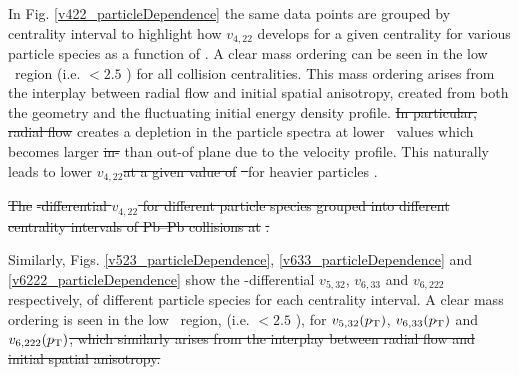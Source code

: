 \documentclass[ALICE,manyauthors]{cernphprep}
\providecommand{\DIFaddtex}[1]{{\protect\color{blue}\uwave{#1}}} %
\providecommand{\DIFdeltex}[1]{{\protect\color{red}\sout{#1}}}                      %
\providecommand{\DIFaddbegin}{} %
\providecommand{\DIFaddend}{} %
\providecommand{\DIFdelbegin}{} %
\providecommand{\DIFdelend}{} %
\providecommand{\DIFdelFL}[1]{\DIFdel{#1}} %
\providecommand{\DIFadd}[1]{\texorpdfstring{\DIFaddtex{#1}}{#1}} %
\providecommand{\DIFdel}[1]{\texorpdfstring{\DIFdeltex{#1}}{}} %
\newcommand{\DIFscaledelfig}{0.5}
\newlength{\DIFdelgraphicswidth} %
\newlength{\DIFdelgraphicsheight} %
\newcommand{\DIFaddincludegraphics}[2][]{{\color{blue}\fbox{\DIFOincludegraphics[#1]{#2}}}} %
\newcommand{\DIFdelincludegraphics}[2][]{%
\sbox{\DIFdelgraphicsbox}{\DIFOincludegraphics[#1]{#2}}%
\settoboxwidth{\DIFdelgraphicswidth}{\DIFdelgraphicsbox} %
\settoboxtotalheight{\DIFdelgraphicsheight}{\DIFdelgraphicsbox} %
\scalebox{\DIFscaledelfig}{%
\parbox[b]{\DIFdelgraphicswidth}{\usebox{\DIFdelgraphicsbox}\\[-\baselineskip] \rule{\DIFdelgraphicswidth}{0em}}\llap{\resizebox{\DIFdelgraphicswidth}{\DIFdelgraphicsheight}{%
\setlength{\unitlength}{\DIFdelgraphicswidth}%
\begin{picture}(1,1)%
\thicklines\linethickness{2pt} %
{\color[rgb]{1,0,0}\put(0,0){\framebox(1,1){}}}%
{\color[rgb]{1,0,0}\put(0,0){\line( 1,1){1}}}%
{\color[rgb]{1,0,0}\put(0,1){\line(1,-1){1}}}%
\end{picture}%
}\hspace*{3pt}}} %
} %
\DeclareRobustCommand{\DIFaddbegin}{\DIFOaddbegin \let\includegraphics\DIFaddincludegraphics} %
\DeclareRobustCommand{\DIFaddend}{\DIFOaddend \let\includegraphics\DIFOincludegraphics} %
\DeclareRobustCommand{\DIFdelbegin}{\DIFOdelbegin \let\includegraphics\DIFdelincludegraphics} %
\DeclareRobustCommand{\DIFdelend}{\DIFOaddend \let\includegraphics\DIFOincludegraphics} %
\begin{document}
\newpage

In Fig. \ref{v422_particleDependence} the same data points are grouped by centrality interval to highlight how $v_{4,22}$ develops for a given centrality for various particle species as a function of \pT.
A clear mass ordering can be seen in the low \pT~region (i.e. \pT $< 2.5$ \GeV) for all collision centralities. This mass ordering arises from the interplay between radial flow and \DIFaddbegin \DIFadd{the }\DIFaddend initial spatial anisotropy, created from both the geometry and the fluctuating initial energy density profile. \DIFdelbegin \DIFdel{In particular, radial flow }\DIFdelend \DIFaddbegin \DIFadd{This }\DIFaddend creates a depletion in the particle spectra at lower \pT~values which becomes larger \DIFdelbegin \DIFdel{in- }\DIFdelend \DIFaddbegin \DIFadd{in-plane }\DIFaddend than out-of plane due to the velocity profile. This naturally leads to lower $v_{4,22}$\DIFdelbegin \DIFdel{at a given value of }\DIFdelend \DIFaddbegin \DIFadd{(}\DIFaddend \pT\DIFdelbegin \DIFdel{~}\DIFdelend \DIFaddbegin \DIFadd{) }\DIFaddend for heavier particles \cite{Voloshin:1996nv, Huovinen:2001cy, Shen:2011eg}. \DIFdelbegin %

{%
\DIFdelFL{The }%
\DIFdelFL{-differential $v_{4,22}$ for different particle species grouped into different centrality intervals of Pb--Pb collisions at }%
\DIFdelFL{.}}

\DIFdelend Similarly, Figs. \ref{v523_particleDependence}, \ref{v633_particleDependence} and \ref{v6222_particleDependence} show the \pT-differential $v_{5,32}$, $v_{6,33}$ and $v_{6,222}$ respectively, of different particle species for each centrality interval. A clear mass ordering is seen in the low \pT~region, (i.e. \pT $< 2.5$ \GeV), for $v_{5,32}(p_{\rm{T}})$, $v_{6,33}(p_{\rm{T}})$ and $v_{6,222}(p_{\rm{T}})$\DIFdelbegin \DIFdel{, which similarly arises from the interplay between radial flow and initial spatial anisotropy.}\DIFdelend \DIFaddbegin \DIFadd{.%
}\DIFaddend 
\end{document}

